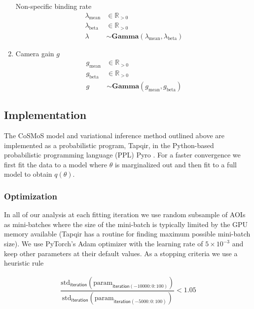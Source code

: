 \begin{enumerate}
Non-specific binding rate
\begin{subequations}
\begin{align}
    \lambda_\mathrm{mean} &\in \mathbb{R}_{>0} \\
    \lambda_\mathrm{beta} &\in \mathbb{R}_{>0} \\
    \lambda &\sim \mathbf{Gamma}(\lambda_\mathrm{mean}, \lambda_\mathrm{beta})
\end{align}
\end{subequations}

\item Camera gain $g$
\begin{subequations}
\begin{align}
    g_\mathrm{mean} &\in \mathbb{R}_{>0} \\
    g_\mathrm{beta} &\in \mathbb{R}_{>0} \\
    g &\sim \mathbf{Gamma}(g_\mathrm{mean}, g_\mathrm{beta})
\end{align}
\end{subequations}
\end{enumerate}

\subsection*{Implementation}

The CoSMoS model and variational inference method outlined above are implemented as a probabilistic program, Tapqir, in the Python-based probabilistic programming language (PPL) Pyro \cite{Bingham2019-qy,Obermeyer2019-xt}. For a faster convergence we first fit the data to a model where $\theta$ is marginalized out and then fit to a full model to obtain $q(\theta)$.

\subsubsection*{Optimization}

In all of our analysis at each fitting iteration we use random subsample of AOIs as mini-batches where the size of the mini-batch is typically limited by the GPU memory available (Tapqir has a routine for finding maximum possible mini-batch size). We use PyTorch's Adam optimizer with the learning rate of $5\times 10^{-3}$ and keep other parameters at their default values. As a stopping criteria we use a heuristic rule

\begin{subequations}
\begin{align}
    \dfrac{\mathrm{std}_\mathsf{iteration}(\mathrm{param}_{\mathsf{iteration}(-10000:0:100)})}{\mathrm{std}_\mathsf{iteration}(\mathrm{param}_{\mathsf{iteration}(-5000:0:100)})} < 1.05
\end{align}
\end{subequations}

